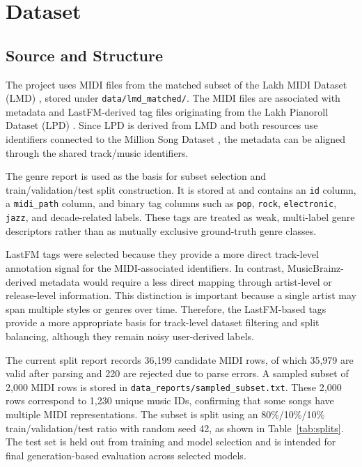 \section{Dataset}

\subsection{Source and Structure}

The project uses MIDI files from the matched subset of the Lakh MIDI Dataset (LMD) \citep{raffelcolinLearningBasedMethodsComparing2016}, stored under \verb|data/lmd_matched/|. The MIDI files are associated with metadata and LastFM-derived tag files originating from the Lakh Pianoroll Dataset (LPD) \citep{dongMuseGANMultitrackSequential2017}. Since LPD is derived from LMD and both resources use identifiers connected to the Million Song Dataset \citep{Bertin-Mahieux2011}, the metadata can be aligned through the shared track/music identifiers.

The genre report is used as the basis for subset selection and train/validation/test split construction. It is stored at  and contains an \verb|id| column, a \verb|midi_path| column, and binary tag columns such as \verb|pop|, \verb|rock|, \verb|electronic|, \verb|jazz|, and decade-related labels. These tags are treated as weak, multi-label genre descriptors rather than as mutually exclusive ground-truth genre classes.

LastFM tags were selected because they provide a more direct track-level annotation signal for the MIDI-associated identifiers. In contrast, MusicBrainz-derived metadata would require a less direct mapping through artist-level or release-level information. This distinction is important because a single artist may span multiple styles or genres over time. Therefore, the LastFM-based tags provide a more appropriate basis for track-level dataset filtering and split balancing, although they remain noisy user-derived labels.

The current split report records 36,199 candidate MIDI rows, of which 35,979 are valid after parsing and 220 are rejected due to parse errors. A sampled subset of 2,000 MIDI rows is stored in \verb|data_reports/sampled_subset.txt|. These 2,000 rows correspond to 1,230 unique music IDs, confirming that some songs have multiple MIDI representations. The subset is split using an 80\%/10\%/10\% train/validation/test ratio with random seed 42, as shown in Table~\ref{tab:splits}. The test set is held out from training and model selection and is intended for final generation-based evaluation across selected models.


